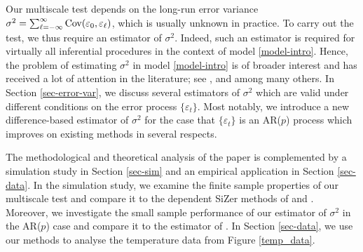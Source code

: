 Our multiscale test depends on the long-run error variance $\sigma^2 = \sum\nolimits_{\ell=-\infty}^{\infty} \textnormal{Cov}(\varepsilon_0,\varepsilon_{\ell})$, which is usually unknown in practice. To carry out the test, we thus require an estimator of $\sigma^2$. Indeed, such an estimator is required for virtually all inferential procedures in the context of model \eqref{model-intro}. Hence, the problem of estimating $\sigma^2$ in model \eqref{model-intro} is of broader interest and has received a lot of attention in the literature; see \cite{MuellerStadtmueller1988}, \cite{Herrmann1992} and \cite{Hall2003} among many others. In Section \ref{sec-error-var}, we discuss several estimators of $\sigma^2$ which are valid under different conditions on the error process $\{\varepsilon_t\}$. Most notably, we introduce a new difference-based estimator of $\sigma^2$ for the case that $\{ \varepsilon_t \}$ is an AR($p$) process which improves on existing methods in several respects. 


The methodological and theoretical analysis of the paper is complemented by a simulation study in Section \ref{sec-sim} and an empirical application in Section \ref{sec-data}. In the simulation study, we examine the finite sample properties of our multiscale test and compare it to the dependent SiZer methods of \cite{Rondonotti2004} and \cite{Rondonotti2007}. Moreover, we investigate the small sample performance of our estimator of $\sigma^2$ in the AR($p$) case and compare it to the estimator of \cite{Hall2003}. In Section \ref{sec-data}, we use our methods to analyse the temperature data from Figure \ref{temp_data}. 


